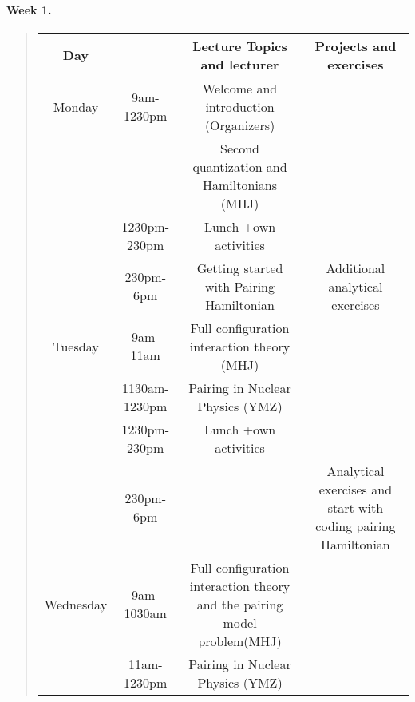 \documentclass[%
oneside,                 %
final,                   %
10pt]{article}
\begin{document}
\noindent
\paragraph{Week 1.}

\begin{quote}
\begin{tabular}{cccc}
\hline
\multicolumn{1}{c}{ Day } & \multicolumn{1}{c}{  } & \multicolumn{1}{c}{ Lecture Topics and lecturer } & \multicolumn{1}{c}{ Projects and exercises } \\
\hline
Monday    & 9am-1230pm    & Welcome  and introduction (Organizers)                                   &                                                                \\
          &               & Second quantization  and Hamiltonians (MHJ)                              &                                                                \\
          & 1230pm-230pm  & Lunch +own activities                                                    &                                                                \\
          & 230pm-6pm     & Getting started with Pairing Hamiltonian                                 & Additional analytical exercises                                \\
\hline
Tuesday   & 9am-11am      & Full configuration interaction theory (MHJ)                              &                                                                \\
          & 1130am-1230pm & Pairing in Nuclear Physics (YMZ)                                         &                                                                \\
          & 1230pm-230pm  & Lunch +own activities                                                    &                                                                \\
          & 230pm-6pm     &                                                                          & Analytical exercises and start with coding pairing Hamiltonian \\
\hline
Wednesday & 9am-1030am    & Full configuration interaction theory and the pairing model problem(MHJ) &                                                                \\
          & 11am-1230pm   & Pairing in Nuclear Physics (YMZ)                                         &                                                                \\

\end{tabular}
\end{quote}
\end{document}
